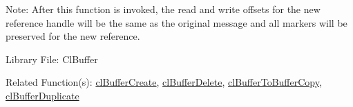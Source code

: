 \begin{Desc}
\item[Note:]After this function is invoked, the read and write offsets for the new reference handle will be the same as the original message and all 
markers will be preserved for the new reference.\end{Desc}
\begin{Desc}
\item[Library File:]Cl\-Buffer\end{Desc}
\begin{Desc}
\item[Related Function(s):]\hyperlink{pagebuf103}{cl\-Buffer\-Create}, \hyperlink{pagebuf105}{cl\-Buffer\-Delete}, 
\hyperlink{pagebuf126}{cl\-Buffer\-To\-Buffer\-Copy}, \hyperlink{pagebuf127}{cl\-Buffer\-Duplicate} \end{Desc}



\newpage
